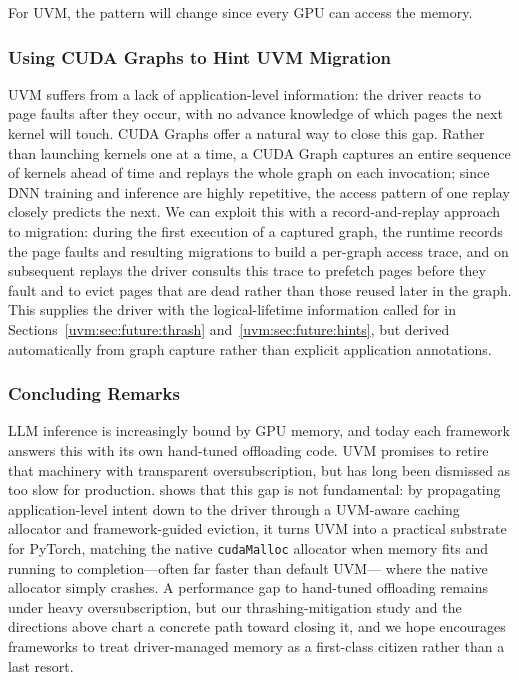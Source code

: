 For UVM, the pattern will change since every GPU can access the memory. 


\subsubsection{Using CUDA Graphs to Hint UVM Migration}
UVM suffers from a lack of application-level information:
    the driver reacts to page faults after they occur,
    with no advance knowledge of which pages the next kernel will touch.
CUDA Graphs offer a natural way to close this gap.
Rather than launching kernels one at a time,
    a CUDA Graph captures an entire sequence of kernels ahead of time
    and replays the whole graph on each invocation;
    since DNN training and inference are highly repetitive,
    the access pattern of one replay closely predicts the next.
We can exploit this with a record-and-replay approach to migration:
    during the first execution of a captured graph,
    the runtime records the page faults and resulting migrations
    to build a per-graph access trace,
    and on subsequent replays the driver consults this trace to
    prefetch pages before they fault and to evict pages that are
    dead rather than those reused later in the graph.
This supplies the driver with the logical-lifetime information called for in
    Sections~\ref{uvm:sec:future:thrash} and~\ref{uvm:sec:future:hints},
    but derived automatically from graph capture rather than
    explicit application annotations.

\subsubsection{Concluding Remarks}
\label{uvm:sec:conclusion}
LLM inference is increasingly bound by GPU memory,
    and today each framework answers this with its own hand-tuned offloading code.
UVM promises to retire that machinery with transparent oversubscription,
    but has long been dismissed as too slow for production.
{\uvmname} shows that this gap is not fundamental:
    by propagating application-level intent down to the driver
    through a UVM-aware caching allocator and framework-guided eviction,
    it turns UVM into a practical substrate for PyTorch,
    matching the native \texttt{cudaMalloc} allocator when memory fits
    and running to completion---often far faster than default UVM---%
    where the native allocator simply crashes.
A performance gap to hand-tuned offloading remains under heavy oversubscription,
    but our thrashing-mitigation study and the directions above
    chart a concrete path toward closing it,
    and we hope {\uvmname} encourages frameworks to treat
    driver-managed memory as a first-class citizen rather than a last resort.
